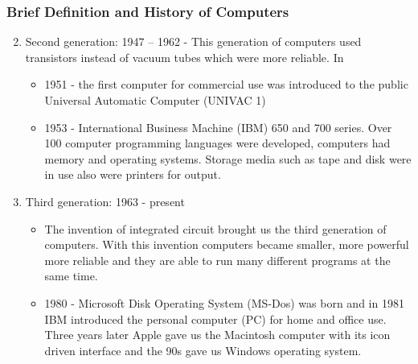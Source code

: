 \begin{frame}
\frametitle{Brief Definition and History of Computers}
\begin{enumerate}
	\setcounter{enumi}{1}
\item Second generation: 1947 – 1962 - This generation of computers used transistors instead of vacuum tubes which were more reliable. In
		\begin{itemize}
			\item 1951 - the first computer for commercial use was introduced to the public Universal Automatic Computer (UNIVAC 1)
			\item 1953 - International Business Machine (IBM) 650 and 700 series. Over 100 computer programming languages were developed, computers had memory and operating systems. Storage media such as tape and disk were in use also were printers for output.
		\end{itemize}
\item Third generation: 1963 - present
		\begin{itemize}
			\item The invention of integrated circuit brought us the third generation of computers. With this invention computers became smaller, more powerful more reliable and they are able to run many different programs at the same time.
			\item 1980 - Microsoft Disk Operating System (MS-Dos) was born and in 1981 IBM introduced the personal computer (PC) for home and office use. Three years later Apple gave us the Macintosh computer with its icon driven interface and the 90s gave us Windows operating system.
		\end{itemize}
\end{enumerate}
\end{frame}